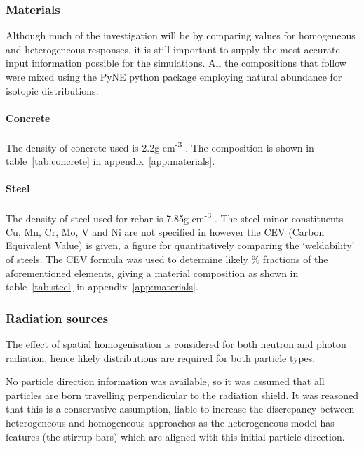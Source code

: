 \subsubsection{Materials}
Although much of the investigation will be by comparing values for homogeneous and heterogeneous responses, it is still important to supply the most accurate input information possible for the simulations. All the compositions that follow were mixed using the PyNE python package \cite{Pyne18} employing natural abundance for isotopic distributions.

\paragraph{Concrete}
The density of concrete used is 2.2g cm\textsuperscript{-3} \cite{Jakhar16}. The composition is shown in table~\ref{tab:concrete} in appendix~\ref{app:materials}. 

\paragraph{Steel}
The density of steel used for rebar is 7.85g cm\textsuperscript{-3} \cite{BSsteel05}. The steel minor constituents Cu, Mn, Cr, Mo, V and Ni are not specified in \cite{BSsteel05} however the CEV (Carbon Equivalent Value) is given, a figure for quantitatively comparing the `weldability' of steels. The CEV formula was used to determine likely \% fractions of the aforementioned elements, giving a material composition as shown in table~\ref{tab:steel} in appendix~\ref{app:materials}.

\subsubsection{Radiation sources}
The effect of spatial homogenisation is considered for both neutron and photon radiation, hence likely distributions are required for both particle types.

No particle direction information was available, so it was assumed that all particles are born travelling perpendicular to the radiation shield. It was reasoned that this is a conservative assumption, liable to increase the discrepancy between heterogeneous and homogeneous approaches as the heterogeneous model has features (the stirrup bars) which are aligned with this initial particle direction.

